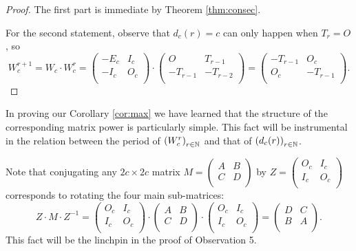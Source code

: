 \begin{proof}
The first part is immediate by Theorem \ref{thm:consec}.

For the second statement, observe that $d_c(r)=c$ can only happen
when $T_r=O$, so
  $$W_{c}^{r+1} = W_c\cdot W_c^r=
\left(\begin{matrix} -E_{c} & I_c \\ -I_{c} & O_c \\\end{matrix}\right)\cdot
\left(\begin{matrix} O & T_{r-1} \\ -T_{r-1} & -T_{r-2} \\\end{matrix}\right)=
\left(\begin{matrix} -T_{r-1} & O_c \\ O_c & -T_{r-1} \\\end{matrix}
\right).$$
\end{proof}
In proving our Corollary \ref{cor:max} we have learned that the
structure of the corresponding matrix power is particularly simple. 
This fact will
be instrumental in the relation between the period of
$\left(W_{c}^{r}\right)_{r\in\mathbb{N}}$ and that of
$\left(d_{c}(r)\right)_{r\in\mathbb{N}}$.

Note that conjugating any $2c\times 2c$ matrix $M=
\left(\begin{smallmatrix} A & B \\ C & D \\\end{smallmatrix}\right)$ by
$Z=\left(\begin{smallmatrix} O_c & I_c \\ I_c & O_c \\\end{smallmatrix}\right)$ 
corresponds to rotating the four main sub-matrices:
\begin{equation}\label{eq:rotate}
Z\cdot M\cdot Z^{-1}=\left(\begin{matrix} O_c & I_c \\ I_c & O_c \\\end{matrix}\right)
\cdot
\left(\begin{matrix} A & B \\ C & D \\\end{matrix}\right)
\cdot
\left(\begin{matrix} O_c & I_c \\ I_c & O_c \\\end{matrix}\right)
=
\left(\begin{matrix} D & C \\ B & A \\\end{matrix}\right).\end{equation}
This fact will be the linchpin in the proof of Observation 5.

